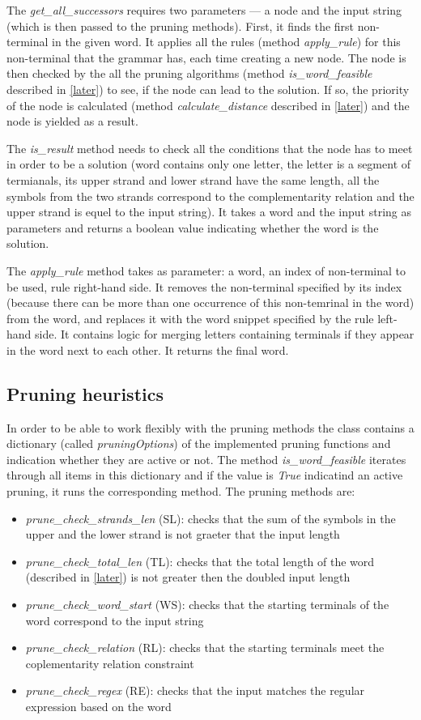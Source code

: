 The \textit{get\_all\_successors} requires two parameters --- a node and the input string (which is then passed to the pruning methods). First, it finds the first non-terminal in the given word. It applies all the rules (method \textit{apply\_rule}) for this non-terminal that the grammar has, each time creating a new node. The node is then checked by the all the pruning algorithms (method \textit{is\_word\_feasible} described in \ref{later}) to see, if the node can lead to the solution. If so, the priority of the node is calculated (method \textit{calculate\_distance} described in \ref{later}) and the node is yielded as a result.

The \textit{is\_result} method needs to check all the conditions that the node has to meet in order to be a solution (word contains only one letter, the letter is a segment of termianals, its upper strand and lower strand have the same length, all the symbols from the two strands correspond to the complementarity relation and the upper strand is equel to the input string). It takes a word and the input string as parameters and returns a boolean value indicating whether the word is the solution.

The \textit{apply\_rule} method takes as parameter: a word, an index of non-terminal to be used, rule right-hand side. It removes the non-terminal specified by its index (because there can be more than one occurrence of this non-temrinal in the word) from the word, and replaces it with the word snippet specified by the rule left-hand side. It contains logic for merging letters containing terminals if they appear in the word next to each other. It returns the final word.

\subsection{Pruning heuristics}
In order to be able to work flexibly with the pruning methods the class contains a dictionary (called \textit{pruningOptions}) of the implemented pruning functions and indication whether they are active or not. The method \textit{is\_word\_feasible} iterates through all items in this dictionary and if the value is \textit{True} indicatind an active pruning, it runs the corresponding method.
The pruning methods are:
\begin{itemize}
  \item{\textit{prune\_check\_strands\_len} (SL): checks that the sum of the symbols in the upper and the lower strand is not graeter that the input length}
  \item{\textit{prune\_check\_total\_len} (TL): checks that the total length of the word (described in \ref{later}) is not greater then the doubled input length}
  \item{\textit{prune\_check\_word\_start} (WS): checks that the starting terminals of the word correspond to the input string}
  \item{\textit{prune\_check\_relation} (RL): checks that the starting terminals meet the coplementarity relation constraint}
  \item{\textit{prune\_check\_regex} (RE): checks that the input matches the regular expression based on the word}
\end{itemize}

